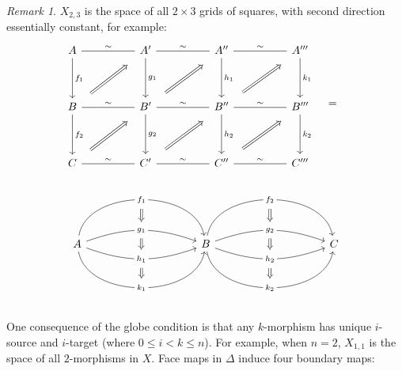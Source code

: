 \documentclass{article}
\theoremstyle{definition}
\theoremstyle{remark}
\newtheorem*{remark}{Remark}
\begin{document}
\begin{remark}
$X_{2,3}$ is the space of all $2 \times 3$ grids of squares, with second direction essentially constant, for example:
$$ \begin{tikzcd}[column sep=huge,row sep=huge]
A 
    \arrow[d, "f_1"] 
    \arrow[r,-,"\sim"] 
& {A'} 
    \arrow[d,"g_1"] 
    \arrow[r,-,"\sim"] 
& {A''}  
    \arrow[d,"h_1"]
    \arrow[r,-,"\sim"] 
& {A'''}  
    \arrow[d,"k_1"]    \\ 
B 
    \arrow[d, "f_2"] 
    \arrow[r,-,"\sim"]
    \arrow[shorten <=10pt,shorten >=10pt,ru,Rightarrow]
& {B'} 
    \arrow[d,"g_2"] 
    \arrow[r,-,"\sim"]
    \arrow[shorten <=10pt,shorten >=10pt,ru,Rightarrow]
& {B''}  
    \arrow[d,"h_2"]
    \arrow[r,-,"\sim"]
    \arrow[shorten <=10pt,shorten >=10pt,ru,Rightarrow]
& {B'''}  
    \arrow[d,"k_2"]    \\ 
C 
    \arrow[r,-,"\sim"]
    \arrow[shorten <=10pt,shorten >=10pt,ru,Rightarrow] 
& {C'}
    \arrow[r,-,"\sim"]
    \arrow[shorten <=10pt,shorten >=10pt,ru,Rightarrow] 
& {C''}
    \arrow[r,-,"\sim"]
    \arrow[shorten <=10pt,shorten >=10pt,ru,Rightarrow]
& {C'''}
\end{tikzcd} \quad = \quad $$
$$\begin{tikzcd}[column sep=huge,row sep=huge,labels=description]
\phantom{first line here} & \phantom{first line here} & \phantom{first line here} \\
{A}
    \arrow[bend left=80pt]{r}[name=1]{f_1}
    \arrow[bend left=20pt]{r}[name=2]{g_1}
    \arrow[bend right=20pt]{r}[name=3]{h_1}
    \arrow[bend right=80pt]{r}[name=4]{k_1}
& {B}
    \arrow[bend left=80pt]{r}[name=5]{f_2}
    \arrow[bend left=20pt]{r}[name=6]{g_2}
    \arrow[bend right=20pt]{r}[name=7]{h_2}
    \arrow[bend right=80pt]{r}[name=8]{k_2}
& {C}
    \arrow[shorten <=3pt,shorten >=3pt,Rightarrow,to path={(1) --  (2)}]{}
    \arrow[shorten <=3pt,shorten >=3pt,Rightarrow,to path={(2) --  (3)}]{}
    \arrow[shorten <=3pt,shorten >=3pt,Rightarrow,to path={(3) --  (4)}]{}
    \arrow[shorten <=3pt,shorten >=3pt,Rightarrow,to path={(5) --  (6)}]{}
    \arrow[shorten <=3pt,shorten >=3pt,Rightarrow,to path={(6) --  (7)}]{}
    \arrow[shorten <=3pt,shorten >=3pt,Rightarrow,to path={(7) --  (8)}]{} \\
\phantom{last     line} & \phantom{last     line} & \phantom{last     line}
\end{tikzcd} $$

One consequence of the globe condition is that any $k$-morphism has unique $i$-source and $i$-target (where $0 \leq i < k \leq n$). For example, when $n=2$, $X_{1,1}$ is the space of all $2$-morphisms in $X$. Face maps in $\Delta$ induce four boundary maps:


\end{remark}
\end{document}
